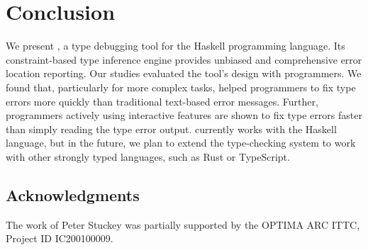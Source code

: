 
\section{Conclusion}

We present \chameleon{}, a type debugging tool for the Haskell programming language. Its constraint-based type inference engine provides unbiased and comprehensive error location reporting. 
Our studies evaluated the tool's design with programmers. We found that, particularly for more complex tasks, \chameleon{} helped programmers to fix type errors more quickly than traditional text-based error messages. Further, programmers actively using \chameleon{} interactive features are shown to fix type errors faster than simply reading the type error output.
\chameleon{} currently works with the Haskell language, but in the future, we plan to extend the type-checking system to work with other strongly typed languages, such as Rust or TypeScript.

\subsection*{Acknowledgments} 

The work of Peter Stuckey was partially supported by the OPTIMA ARC ITTC, Project ID IC200100009.

\goodbreak\noindent